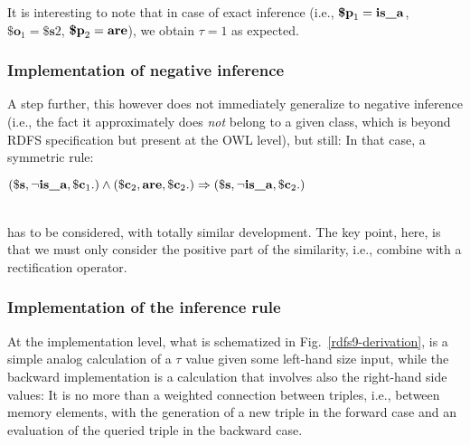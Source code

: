 \documentclass[sn-mathphys]{sn-jnl}
\newcommand{\eqline}[1]{~\vspace{0.1cm}\\\centerline{$#1$}\vspace{0.1cm}\\}
\begin{document}
It is interesting to note that in case of exact inference (i.e., $\textbf{\$p}_1 = \texttt{\bf is\_a}$, $\textbf{\$o}_1 = \textbf{\$s}2$, $\textbf{\$p}_2 = \texttt{\bf are}$), we obtain $\tau = 1$ as expected.

\subsubsection{Implementation of negative inference}

A step further, this however does not immediately generalize to negative inference (i.e., the fact it approximately does {\em not} belong to a given class, which is beyond RDFS specification but present at the OWL level), but still: In that case, a symmetric rule:
\eqline{(\mathbf{\$s} ,  \neg \texttt{\bf is\_a} ,  \mathbf{\$c}_1 .) \wedge (\mathbf{\$c}_2 ,  \texttt{\bf are} ,  \mathbf{\$c}_2 .)  \Rightarrow (\mathbf{\$s} ,  \neg \texttt{\bf is\_a} ,  \mathbf{\$c}_2 .)}
has to be considered, with totally similar development. The key point, here, is that we must only consider the positive part of the similarity, i.e., combine with a rectification operator.

\subsubsection{Implementation of the inference rule}

At the implementation level, what is schematized in Fig.~\ref{rdfs9-derivation}, is a simple analog calculation of a $\tau$ value given some left-hand size input, while the backward implementation is a calculation that involves also the right-hand side values: It is no more than a weighted connection between triples, i.e., between memory elements, with the generation of a new triple in the forward case and an evaluation of the queried triple in the backward case.
\end{document}
